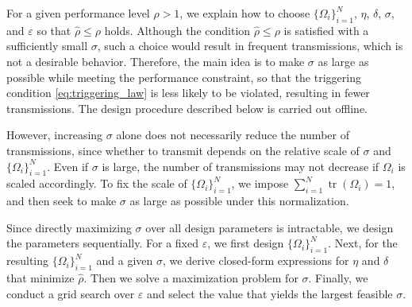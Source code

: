 \documentclass[letterpaper,10pt,conference]{ieeeconf}
\DeclareMathOperator{\tr}{tr}
\begin{document}
For a given performance level $\rho > 1$, we explain how to choose $\{\Omega_i\}_{i=1}^N$, $\eta$, $\delta$, $\sigma$, and $\varepsilon$ so that $\hat{\rho} \le \rho$ holds.
Although the condition $\hat{\rho} \le \rho$ is satisfied with a sufficiently small $\sigma$, such a choice would result in frequent transmissions, which is not a desirable behavior.
Therefore, the main idea is to make $\sigma$ as large as possible while meeting the performance constraint, so that the triggering condition \eqref{eq:triggering_law} is less likely to be violated, resulting in fewer transmissions.
The design procedure described below is carried out offline.

However, increasing $\sigma$ alone does not necessarily reduce the number of transmissions, since whether to transmit depends on the relative scale of $\sigma$ and $\{\Omega_i\}_{i=1}^N$.
Even if $\sigma$ is large, the number of transmissions may not decrease if $\Omega_i$ is scaled accordingly.
To fix the scale of $\{\Omega_i\}_{i=1}^N$, we impose $\sum_{i=1}^N \tr(\Omega_i) = 1$,
and then seek to make $\sigma$ as large as possible under this normalization.

Since directly maximizing $\sigma$ over all design parameters is intractable, we design the parameters sequentially.
For a fixed $\varepsilon$, we first design $\{\Omega_i\}_{i=1}^N$.
Next, for the resulting $\{\Omega_i\}_{i=1}^N$ and a given $\sigma$, we derive closed-form expressions for $\eta$ and $\delta$ that minimize $\hat{\rho}$.
Then we solve a maximization problem for $\sigma$.
Finally, we conduct a grid search over $\varepsilon$ and select the value that yields the largest feasible $\sigma$.
\end{document}
